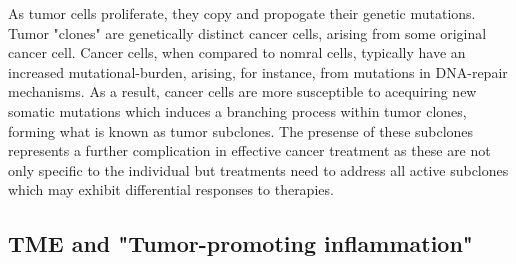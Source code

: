 As tumor cells proliferate, they copy and propogate their genetic mutations.
Tumor "clones" are genetically distinct cancer cells, arising from some original cancer cell.
Cancer cells, when compared to nomral cells, typically have an increased mutational-burden, arising, for instance, from mutations in DNA-repair mechanisms.
As a result, cancer cells are more susceptible to acequiring new somatic mutations which induces a branching process within tumor clones, forming what is known as tumor subclones.
The presense of these subclones represents a further complication in effective cancer treatment as these are not only specific to the individual but treatments need to address all active subclones which may exhibit differential responses to therapies.

\subsection{TME and "Tumor-promoting inflammation"}

%
%
%
%
%
%


